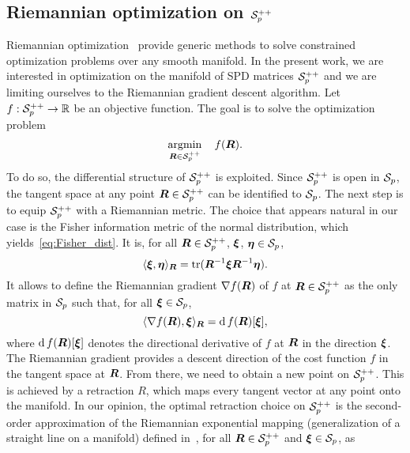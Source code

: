 \documentclass{article}
\theoremstyle{plain}
\theoremstyle{definition}
\theoremstyle{remark}
\begin{document}
\subsection{Riemannian optimization on $\mathcal{S}^{++}_{p}$}
\label{sec:preliminaries:Ropt}
Riemannian optimization~\cite{absil2009optimization,boumal2023introduction} provide generic methods to solve constrained optimization problems over any smooth manifold.
In the present work, we are interested in optimization on the manifold of SPD matrices $\mathcal{S}^{++}_{p}$ and we are limiting ourselves to the Riemannian gradient descent algorithm.
Let $f:\mathcal{S}^{++}_{p}\to\mathbb{R}$ be an objective function.
The goal is to solve the optimization problem
\begin{equation*}
    \operatorname*{argmin}_{\boldsymbol{R}\in\mathcal{S}^{++}_{p}} \quad f(\boldsymbol{R}).
\end{equation*}
To do so, the differential structure of $\mathcal{S}^{++}_{p}$ is exploited.
Since $\mathcal{S}^{++}_{p}$ is open in $\mathcal{S}_{p}$, the tangent space at any point $\boldsymbol{R}\in\mathcal{S}^{++}_{p}$ can be identified to $\mathcal{S}_{p}$.
%
The next step is to equip $\mathcal{S}^{++}_{p}$ with a Riemannian metric.
The choice that appears natural in our case is the Fisher information metric of the normal distribution, which yields~\eqref{eq:Fisher_dist}. 
It is, for all $\boldsymbol{R}\in\mathcal{S}^{++}_{p}$, $\boldsymbol{\xi}$, $\boldsymbol{\eta}\in\mathcal{S}_{p}$,
\begin{equation}
    \langle \boldsymbol{\xi}, \boldsymbol{\eta} \rangle_{\boldsymbol{R}} = 
    \operatorname{tr}(\boldsymbol{R}^{-1}\boldsymbol{\xi}\boldsymbol{R}^{-1}\boldsymbol{\eta}).
\label{eq:Fisher_metric}
\end{equation}
%
It allows to define the Riemannian gradient $\nabla f(\boldsymbol{R})$ of $f$ at $\boldsymbol{R}\in\mathcal{S}^{++}_{p}$ as the only matrix in $\mathcal{S}_{p}$ such that, for all $\boldsymbol{\xi}\in\mathcal{S}_{p}$,
\begin{equation}
    \langle \nabla f(\boldsymbol{R}), \boldsymbol{\xi} \rangle_{\boldsymbol{R}} = \operatorname{d} f(\boldsymbol{R})[\boldsymbol{\xi}],
\end{equation}
where $\operatorname{d} f(\boldsymbol{R})[\boldsymbol{\xi}]$ denotes the directional derivative of $f$ at $\boldsymbol{R}$ in the direction $\boldsymbol{\xi}$.
The Riemannian gradient provides a descent direction of the cost function $f$ in the tangent space at $\boldsymbol{R}$.
%
From there, we need to obtain a new point on $\mathcal{S}^{++}_{p}$.
This is achieved by a retraction $R$, which maps every tangent vector at any point onto the manifold.
In our opinion, the optimal retraction choice on $\mathcal{S}^{++}_{p}$ is the second-order approximation of the Riemannian exponential mapping (generalization of a straight line on a manifold) defined in~\cite{jeuris2012survey}, for all $\boldsymbol{R}\in\mathcal{S}^{++}_{p}$ and $\boldsymbol{\xi}\in\mathcal{S}_{p}$, as
\end{document}
